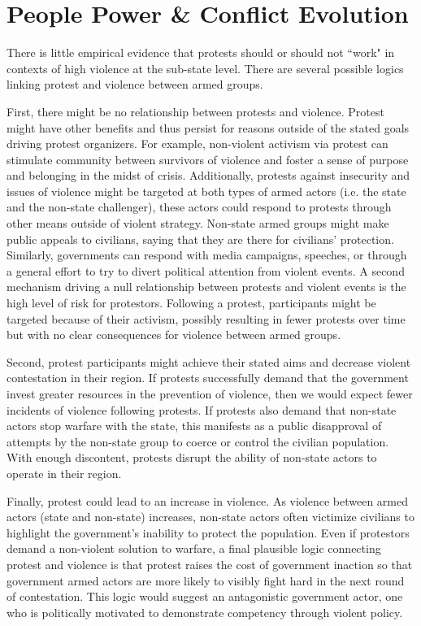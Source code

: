 \section*{People Power \& Conflict Evolution}

There is little empirical evidence that protests should or should not ``work" in contexts of high violence at the sub-state level. There are several possible logics linking protest and violence between armed groups.

First, there might be no relationship between protests and violence. Protest might have other benefits and thus persist for reasons outside of the stated goals driving protest organizers. For example, non-violent activism via protest can stimulate community between survivors of violence and foster a sense of purpose and belonging in the midst of crisis. Additionally, protests against insecurity and issues of violence might be targeted at both types of armed actors (i.e. the state and the non-state challenger), these actors could respond to protests through other means outside of violent strategy. Non-state armed groups might make public appeals to civilians, saying that they are there for civilians' protection. Similarly,  governments can respond with media campaigns, speeches, or through a general effort to try to divert political attention from violent events. A second mechanism driving a null relationship between protests and violent events is the high level of risk for protestors. Following a protest, participants might be targeted because of their activism, possibly resulting in fewer protests over time but with no clear consequences for violence between armed groups.

Second, protest participants might achieve their stated aims and decrease violent contestation in their region. If protests successfully demand that the government invest greater resources in the prevention of violence, then we would expect fewer incidents of violence following protests. If protests also demand that non-state actors stop warfare with the state, this manifests as a public disapproval of attempts by the non-state group to coerce or control the civilian population. With enough discontent, protests disrupt the ability of non-state actors to operate in their region.

Finally, protest could lead to an increase in violence. As violence between armed actors (state and non-state) increases, non-state actors often victimize civilians to highlight the government's inability to protect the population. Even if protestors demand a non-violent solution to warfare, a final plausible logic connecting protest and violence is that protest raises the cost of government inaction so that government armed actors are more likely to visibly fight hard in the next round of contestation. This logic would suggest an antagonistic government actor, one who is politically motivated to demonstrate competency through violent policy.



